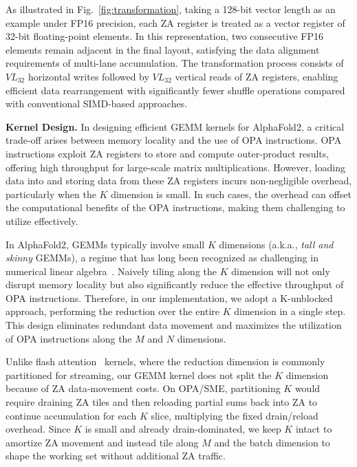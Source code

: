 As illustrated in Fig.~\ref{fig:transformation}, taking a 128-bit vector length as an example under FP16 precision, each ZA register is treated as a vector register of 32-bit floating-point elements. In this representation, two consecutive FP16 elements remain adjacent in the final layout, satisfying the data alignment requirements of multi-lane accumulation. The transformation process consists of $\mathit{VL}_{32}$ horizontal writes followed by $\mathit{VL}_{32}$ vertical reads of ZA registers, enabling efficient data rearrangement with significantly fewer shuffle operations compared with conventional SIMD-based approaches.

\textbf{Kernel Design.}
In designing efficient GEMM kernels for AlphaFold2, a critical trade-off arises between memory locality and the use of OPA instructions. OPA instructions exploit ZA registers to store and compute outer-product results, offering high throughput for large-scale matrix multiplications. However, loading data into and storing data from these ZA registers incurs non-negligible overhead, particularly when the $K$ dimension is small. In such cases, the overhead can offset the computational benefits of the OPA instructions, making them challenging to utilize effectively.

In AlphaFold2, GEMMs typically involve small $K$ dimensions (a.k.a., \textit{tall and skinny} GEMMs), a regime that has long been recognized as challenging in numerical linear algebra~\cite{demmel2012communication,anderson2011communication}. Naively tiling along the $K$ dimension will not only disrupt memory locality but also significantly reduce the effective throughput of OPA instructions. Therefore, in our implementation, we adopt a K-unblocked approach, performing the reduction over the entire $K$ dimension in a single step. This design eliminates redundant data movement and maximizes the utilization of OPA instructions along the $M$ and $N$ dimensions.

Unlike flash attention~\cite{dao2022flashattention,dao2023flashattention} kernels, where the reduction dimension is commonly partitioned for streaming, our GEMM kernel does not split the $K$ dimension because of ZA data-movement costs. On OPA/SME, partitioning $K$ would require draining ZA tiles and then reloading partial sums back into ZA to continue accumulation for each $K$ slice, multiplying the fixed drain/reload overhead. Since $K$ is small and already drain-dominated, we keep $K$ intact to amortize ZA movement and instead tile along $M$ and the batch dimension to shape the working set without additional ZA traffic.

